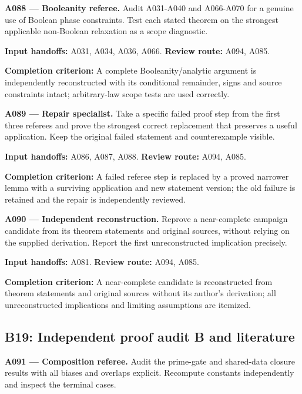 \documentclass[11pt]{article}
\begin{document}
\textbf{A088 --- Booleanity referee.} Audit A031-A040 and A066-A070 for a genuine use of Boolean phase constraints. Test each stated theorem on the strongest applicable non-Boolean relaxation as a scope diagnostic.

{\small\color{ink}\textbf{Input handoffs:} A031, A034, A036, A066. \textbf{Review route:} A094, A085.\par
\textbf{Completion criterion:} A complete Booleanity/analytic argument is independently reconstructed with its conditional remainder, signs and source constraints intact; arbitrary-law scope tests are used correctly.\par}



\textbf{A089 --- Repair specialist.} Take a specific failed proof step from the first three referees and prove the strongest correct replacement that preserves a useful application. Keep the original failed statement and counterexample visible.

{\small\color{ink}\textbf{Input handoffs:} A086, A087, A088. \textbf{Review route:} A094, A085.\par
\textbf{Completion criterion:} A failed referee step is replaced by a proved narrower lemma with a surviving application and new statement version; the old failure is retained and the repair is independently reviewed.\par}



\textbf{A090 --- Independent reconstruction.} Reprove a near-complete campaign candidate from its theorem statements and original sources, without relying on the supplied derivation. Report the first unreconstructed implication precisely.

{\small\color{ink}\textbf{Input handoffs:} A081. \textbf{Review route:} A094, A085.\par
\textbf{Completion criterion:} A near-complete candidate is reconstructed from theorem statements and original sources without its author's derivation; all unreconstructed implications and limiting assumptions are itemized.\par}



\subsection{B19: Independent proof audit B and literature}

\textbf{A091 --- Composition referee.} Audit the prime-gate and shared-data closure results with all biases and overlaps explicit. Recompute constants independently and inspect the terminal cases.
\end{document}
